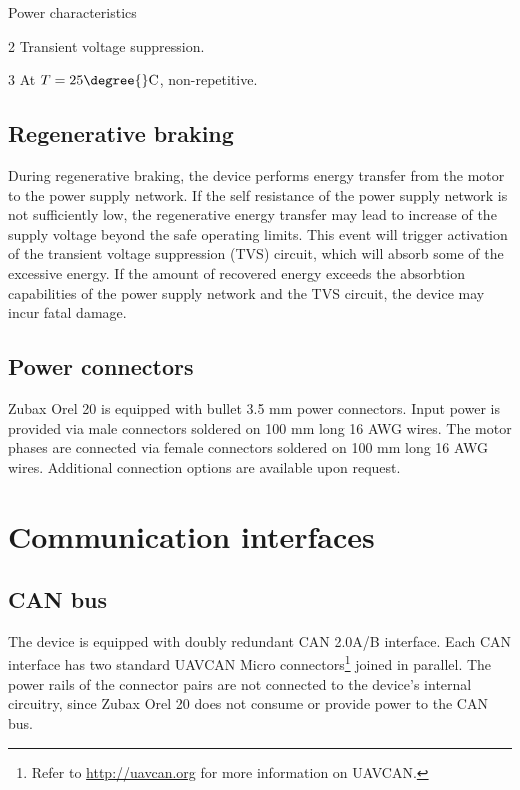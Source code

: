 \documentclass{zubaxdoc}
\begin{document}
\begin{ZubaxTableWrapper}{Power characteristics}
\begin{tablenotes}
	    \item [2] Transient voltage suppression.

	    \item [3] At $T = 25\text{\degree{}C}$, non-repetitive.
	\end{tablenotes}
\end{ZubaxTableWrapper}

\subsection{Regenerative braking}

During regenerative braking, the device performs energy transfer from the motor to the power supply network.
If the self resistance of the power supply network is not sufficiently low,
the regenerative energy transfer may lead to increase of the supply voltage beyond
the safe operating limits.
This event will trigger activation of the transient voltage suppression (TVS) circuit,
which will absorb some of the excessive energy.
If the amount of recovered energy exceeds the absorbtion capabilities of the power supply
network and the TVS circuit, the device may incur fatal damage.

\subsection{Power connectors}

Zubax Orel 20 is equipped with bullet 3.5 mm power connectors.
Input power is provided via male connectors soldered on 100 mm long 16 AWG wires.
The motor phases are connected via female connectors soldered on 100 mm long 16 AWG wires.
Additional connection options are available upon request.

\section{Communication interfaces}

\subsection{CAN bus}

The device is equipped with doubly redundant CAN 2.0A/B interface.
Each CAN interface has two standard UAVCAN Micro connectors\footnote{Refer to
\url{http://uavcan.org} for more information on UAVCAN.}
joined in parallel.
The power rails of the connector pairs are not connected to the device's internal circuitry,
since Zubax Orel 20 does not consume or provide power to the CAN bus.
\end{document}
